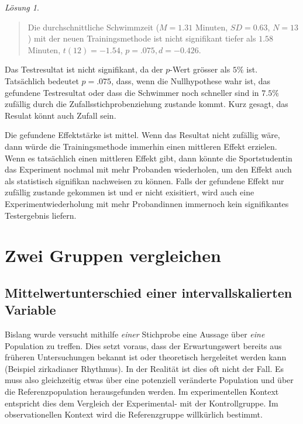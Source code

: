 \documentclass[
]{book}
\theoremstyle{definition}
\theoremstyle{definition}
\theoremstyle{definition}
\theoremstyle{definition}
\theoremstyle{remark}
\newtheorem*{solution}{Lösung}
\begin{document}
\begin{solution}
\begin{quote}
Die durchschnittliche Schwimmzeit (\(M = 1.31\) Minuten, \(SD = 0.63\), \(N = 13\)) mit der neuen Trainingsmethode ist nicht signifikant tiefer als \(1.58\) Minuten, \(t(12) = -1.54\), \(p = .075, d = -0.426\).
\end{quote}

Das Testresultat ist nicht signifikant, da der \(p\)-Wert grösser als \(5\%\) ist. Tatsächlich bedeutet \(p = .075\), dass, wenn die Nullhypothese wahr ist, das gefundene Testresultat oder dass die Schwimmer noch schneller sind in \(7.5\%\) zufällig durch die Zufallsstichprobenziehung zustande kommt. Kurz gesagt, das Resulat könnt auch Zufall sein.

Die gefundene Effektstärke ist mittel. Wenn das Resultat nicht zufällig wäre, dann würde die Trainingsmethode immerhin einen mittleren Effekt erzielen. Wenn es tatsächlich einen mittleren Effekt gibt, dann könnte die Sportstudentin das Experiment nochmal mit mehr Probanden wiederholen, um den Effekt auch als statistisch signifikan nachweisen zu können. Falls der gefundene Effekt nur zufällig zustande gekommen ist und er nicht exisitiert, wird auch eine Experimentwiederholung mit mehr Probandinnen immernoch kein signifikantes Testergebnis liefern.
\end{solution}

\part{Zwei Gruppen vergleichen}\label{part-zwei-gruppen-vergleichen}

\chapter{Mittelwertunterschied einer intervallskalierten Variable}\label{mittelwertunterschied-einer-intervallskalierten-variable}

Bislang wurde versucht mithilfe \emph{einer} Stichprobe eine Aussage über \emph{eine} Population zu treffen. Dies setzt voraus, dass der Erwartungswert bereits aus früheren Untersuchungen bekannt ist oder theoretisch hergeleitet werden kann (Beispiel zirkadianer Rhythmus). In der Realität ist dies oft nicht der Fall. Es muss also gleichzeitig etwas über eine potenziell veränderte Population und über die Referenzpopulation herausgefunden werden. Im experimentellen Kontext entspricht dies dem Vergleich der Experimental- mit der Kontrollgruppe. Im observationellen Kontext wird die Referenzgruppe willkürlich bestimmt.
\end{document}
